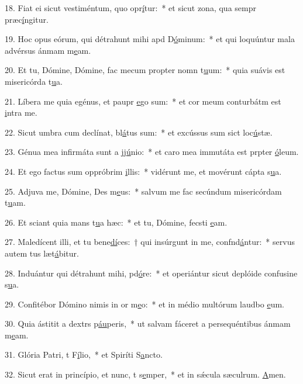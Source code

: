 18. Fiat ei sicut vestiméntum, quo opr\uline{í}tur:~* et sicut zona, qua sempr præc\uline{í}ngitur.\par 
19. Hoc opus eórum, qui détrahunt mihi apd D\uline{ó}minum:~* et qui loquúntur mala advérsus ánmam m\uline{e}am.\par 
20. Et tu, Dómine, Dómine, fac mecum propter nomn t\uline{u}um:~* quia suávis est misericórda t\uline{u}a.\par 
21. Líbera me quia egénus, et paupr \uline{e}go sum:~* et cor meum conturbátm est \uline{i}ntra me.\par 
22. Sicut umbra cum declínat, bl\uline{á}tus sum:~* et excússus sum sict loc\uline{ú}stæ.\par 
23. Génua mea infirmáta sunt a jj\uline{ú}nio:~* et caro mea immutáta est prpter \uline{ó}leum.\par 
24. Et ego factus sum oppróbrim \uline{i}llis:~* vidérunt me, et movérunt cápta s\uline{u}a.\par 
25. Adjuva me, Dómine, Des m\uline{e}us:~* salvum me fac secúndum misericórdam t\uline{u}am.\par 
26. Et sciant quia mans t\uline{u}a hæc:~* et tu, Dómine, fecsti \uline{e}am.\par 
27. Maledícent illi, et tu bene\uline{dí}ces:~† qui insúrgunt in me, confnd\uline{á}ntur:~* servus autem tus læt\uline{á}bitur.\par 
28. Induántur qui détrahunt mihi, pd\uline{ó}re:~* et operiántur sicut deplóide confusine s\uline{u}a.\par 
29. Confitébor Dómino nimis in or m\uline{e}o:~* et in médio multórum laudbo \uline{e}um.\par 
30. Quia ástitit a dextrs p\uline{áu}peris,~* ut salvam fáceret a persequéntibus ánmam m\uline{e}am.\par 
31. Glória Patri, t F\uline{í}lio,~* et Spiríti S\uline{a}ncto.\par 
32. Sicut erat in princípio, et nunc, t s\uline{e}mper,~* et in sǽcula sæculrum. \uline{A}men.\par 
